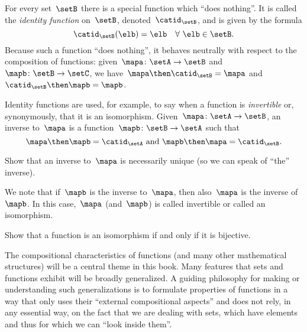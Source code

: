 For every set~$\setB$ there is a special function which ``does nothing''.
It is called the \emph{identity function} on~$\setB$, denoted~$\catid_\setB$, and is given by the formula
\begin{equation*}
    \catid_\setB(\elb) = \elb \quad \forall \ \elb \in \setB.
\end{equation*}
Because such a function ``does nothing'', it behaves neutrally with respect to the composition of functions:
given~$\mapa \colon \setA \to \setB$ and~$\mapb \colon \setB \to \setC$, we have~$\mapa \then \catid_\setB = \mapa$ and~$\catid_\setB \then \mapb = \mapb$.

Identity functions are used, for example, to say when a function is \emph{invertible} or, synonymously, that it is an isomorphism.
Given~$\mapa \colon \setA \to \setB$, an inverse to~$\mapa$ is a function~$\mapb \colon \setB \to \setA$ such that
\begin{equation}
    \label{eq:isomorphism-equations}
    \mapa \then \mapb = \catid_\setA \text{ and }  \mapb \then \mapa = \catid_\setB.
\end{equation}


\begin{exercise}
    Show that an inverse to~$\mapa$ is necessarily unique (so we can speak of ``the'' inverse).
\end{exercise}
\begin{solution}
\end{solution}
We note that if~$\mapb$ is the inverse to~$\mapa$, then also~$\mapa$ is the inverse of~$\mapb$.
In this case,~$\mapa$ (and~$\mapb$) is called invertible or called an isomorphism.

\begin{exercise}
    \label{ex:bijective-functions-are-isomorphisms}
    Show that a function is an isomorphism if and only if it is bijective.
\end{exercise}
\begin{solution}
\end{solution}

The compositional characteristics of functions (and many other mathematical structures) will be a central theme in this book.
Many features that sets and functions exhibit will be broadly generalized.
A guiding philosophy for making or understanding such generalizations is to formulate properties of functions in a way that only uses their ``external compositional aspects'' and does not rely, in any essential way, on the fact that we are dealing with sets, which have elements and thus for which we can ``look inside them''.

